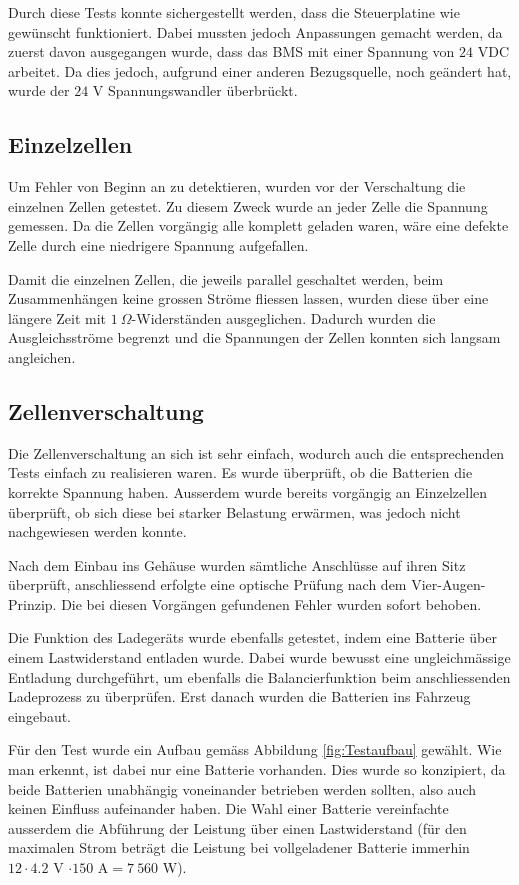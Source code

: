 Durch diese Tests konnte sichergestellt werden, dass die Steuerplatine wie gewünscht funktioniert. Dabei mussten jedoch Anpassungen gemacht werden, da zuerst davon ausgegangen wurde, dass das BMS mit einer Spannung von $24$ VDC arbeitet. Da dies jedoch, aufgrund einer anderen Bezugsquelle, noch geändert hat, wurde der $24$ V Spannungswandler überbrückt.

\subsection{Einzelzellen}
Um Fehler von Beginn an zu detektieren, wurden vor der Verschaltung die einzelnen Zellen getestet. Zu diesem Zweck wurde an jeder Zelle die Spannung gemessen. Da die Zellen vorgängig alle komplett geladen waren, wäre eine defekte Zelle durch eine niedrigere Spannung aufgefallen.

Damit die einzelnen Zellen, die jeweils parallel geschaltet werden, beim Zusammenhängen keine grossen Ströme fliessen lassen, wurden diese über eine längere Zeit mit $1\ \Omega$-Widerständen ausgeglichen. Dadurch wurden die Ausgleichsströme begrenzt und die Spannungen der Zellen konnten sich langsam angleichen.

\subsection{Zellenverschaltung}
Die Zellenverschaltung an sich ist sehr einfach, wodurch auch die entsprechenden Tests einfach zu realisieren waren. Es wurde überprüft, ob die Batterien die korrekte Spannung haben. Ausserdem wurde bereits vorgängig an Einzelzellen überprüft, ob sich diese bei starker Belastung erwärmen, was jedoch nicht nachgewiesen werden konnte.

Nach dem Einbau ins Gehäuse wurden sämtliche Anschlüsse auf ihren Sitz überprüft, anschliessend erfolgte eine optische Prüfung nach dem Vier-Augen-Prinzip. Die bei diesen Vorgängen gefundenen Fehler wurden sofort behoben.

Die Funktion des Ladegeräts wurde ebenfalls getestet, indem eine Batterie über einem Lastwiderstand entladen wurde. Dabei wurde bewusst eine ungleichmässige Entladung durchgeführt, um ebenfalls die Balancierfunktion beim anschliessenden Ladeprozess zu überprüfen. Erst danach wurden die Batterien ins Fahrzeug eingebaut.

Für den Test wurde ein Aufbau gemäss Abbildung \ref{fig:Testaufbau} gewählt. Wie man erkennt, ist dabei nur eine Batterie vorhanden. Dies wurde so konzipiert, da beide Batterien unabhängig voneinander betrieben werden sollten, also auch keinen Einfluss aufeinander haben. Die Wahl einer Batterie vereinfachte ausserdem die Abführung der Leistung über einen Lastwiderstand (für den maximalen Strom beträgt die Leistung bei vollgeladener Batterie immerhin \linebreak$12\cdot4.2$ V $\cdot 150$ A$=7\ 560$ W).\newpage

